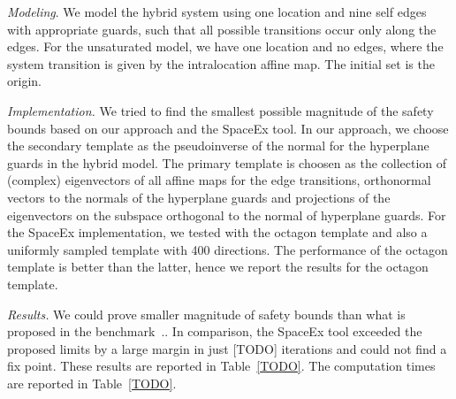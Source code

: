\emph{Modeling}.  We model the hybrid system using one location and
nine self edges with appropriate guards, such that all possible
transitions occur only along the edges.  For the unsaturated model, we
have one location and no edges, where the system transition is given
by the intralocation affine map.  The initial set is the origin.

\emph{Implementation.}  We tried to find the smallest possible
magnitude of the safety bounds based on our approach and the SpaceEx
tool.  In our approach, we choose the secondary template as the
pseudoinverse of the normal for the hyperplane guards in the hybrid
model.  The primary template is choosen as the collection of (complex)
eigenvectors of all affine maps for the edge transitions, orthonormal
vectors to the normals of the hyperplane guards and projections of the
eigenvectors on the subspace orthogonal to the normal of hyperplane
guards.  For the SpaceEx implementation, we tested with the octagon
template and also a uniformly sampled template with 400 directions.
The performance of the octagon template is better than the latter,
hence we report the results for the octagon template.

\emph{Results.}  We could prove smaller magnitude of safety bounds
than what is proposed in the benchmark~\cite{TODO}..  In comparison,
the SpaceEx tool exceeded the proposed limits by a large margin in just
[TODO] iterations and could not find a fix point.  These results are
reported in Table~\ref{TODO}.  The computation times are reported in
Table~\ref{TODO}.

